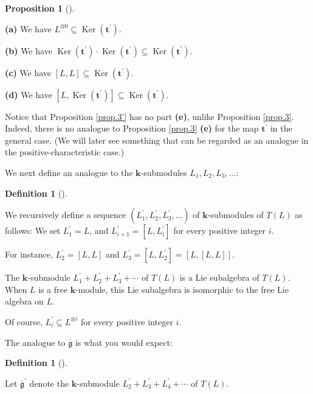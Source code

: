 \documentclass[numbers=enddot,12pt,final,onecolumn,notitlepage]{scrartcl}%
\theoremstyle{definition}
\newtheorem{prop}[theo]{Proposition}
\newenvironment{proposition}[1][]
{\begin{prop}[#1]\begin{leftbar}}
{\end{leftbar}\end{prop}}
\newtheorem{defi}[theo]{Definition}
\newenvironment{definition}[1][]
{\begin{defi}[#1]\begin{leftbar}}
{\end{leftbar}\end{defi}}
\begin{document}
\begin{proposition}
\label{prop.3'}\textbf{(a)} We have $L^{\otimes0}\subseteq\operatorname*{Ker}%
\left(  \mathbf{t}^{\prime}\right)  $. \medskip

\textbf{(b)} We have $\operatorname*{Ker}\left(  \mathbf{t}^{\prime}\right)
\cdot\operatorname*{Ker}\left(  \mathbf{t}^{\prime}\right)  \subseteq
\operatorname*{Ker}\left(  \mathbf{t}^{\prime}\right)  $. \medskip

\textbf{(c)} We have $\left[  L,L\right]  \subseteq\operatorname*{Ker}\left(
\mathbf{t}^{\prime}\right)  $. \medskip

\textbf{(d)} We have $\left[  L,\operatorname*{Ker}\left(  \mathbf{t}^{\prime
}\right)  \right]  \subseteq\operatorname*{Ker}\left(  \mathbf{t}^{\prime
}\right)  $.
\end{proposition}

Notice that Proposition \ref{prop.3'} has no part \textbf{(e)}, unlike
Proposition \ref{prop.3}. Indeed, there is no analogue to Proposition
\ref{prop.3} \textbf{(e)} for the map $\mathbf{t}^{\prime}$ in the general
case. (We will later see something that can be regarded as an analogue in the
positive-characteristic case.)

We next define an analogue to the $\mathbf{k}$-submodules $L_{1},L_{2}%
,L_{3},\ldots$:

\begin{definition}
We recursively define a sequence $\left(  L_{1}^{\prime},L_{2}^{\prime}%
,L_{3}^{\prime},\ldots\right)  $ of $\mathbf{k}$-submodules of $T\left(
L\right)  $ as follows: We set $L_{1}^{\prime}=L$, and $L_{i+1}^{\prime
}=\left[  L,L_{i}^{\prime}\right]  $ for every positive integer $i$.
\end{definition}

For instance, $L_{2}^{\prime}=\left[  L,L\right]  $ and $L_{3}^{\prime
}=\left[  L,L_{2}^{\prime}\right]  =\left[  L,\left[  L,L\right]  \right]  $.

The $\mathbf{k}$-submodule $L_{1}^{\prime}+L_{2}^{\prime}+L_{3}^{\prime
}+\cdots$ of $T\left(  L\right)  $ is a Lie subalgebra of $T\left(  L\right)
$. When $L$ is a free $\mathbf{k}$-module, this Lie subalgebra is isomorphic
to the free Lie algebra on $L$.

Of course, $L_{i}^{\prime}\subseteq L^{\otimes i}$ for every positive integer
$i$.

The analogue to $\overline{\mathfrak{g}}$ is what you would expect:

\begin{definition}
Let $\overline{\mathfrak{g}}^{\prime}$ denote the $\mathbf{k}$-submodule
$L_{2}^{\prime}+L_{3}^{\prime}+L_{4}^{\prime}+\cdots$ of $T\left(  L\right)  $.
\end{definition}
\end{document}
